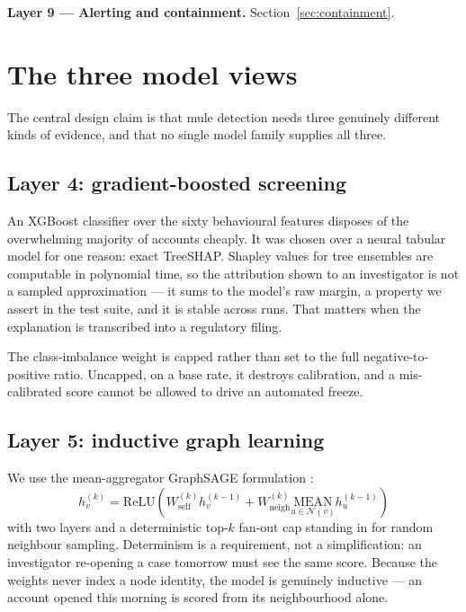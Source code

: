 \documentclass{article}
\begin{document}
\noindent\textbf{Layer 9 --- Alerting and containment.}
Section~\ref{sec:containment}.

\section{The three model views}
\label{sec:models}

The central design claim is that mule detection needs three genuinely different
kinds of evidence, and that no single model family supplies all three.

\subsection{Layer 4: gradient-boosted screening}

An XGBoost classifier over the sixty behavioural features disposes of the
overwhelming majority of accounts cheaply. It was chosen over a neural tabular
model for one reason: exact TreeSHAP. Shapley values for tree ensembles are
computable in polynomial time, so the attribution shown to an investigator is
not a sampled approximation --- it sums to the model's raw margin, a property we
assert in the test suite, and it is stable across runs. That matters when the
explanation is transcribed into a regulatory filing.

The class-imbalance weight is capped rather than set to the full negative-to-
positive ratio. Uncapped, on a \dsMuleRate{} base rate, it destroys calibration,
and a mis-calibrated score cannot be allowed to drive an automated freeze.

\subsection{Layer 5: inductive graph learning}

We use the mean-aggregator GraphSAGE formulation \cite{hamilton2017}:
%
\begin{equation}
h_v^{(k)} = \mathrm{ReLU}\!\left(
  W_{\text{self}}^{(k)} h_v^{(k-1)} +
  W_{\text{neigh}}^{(k)} \!\!\!\underset{u \in \mathcal{N}(v)}{\mathrm{MEAN}}\!\!\! h_u^{(k-1)}
\right)
\end{equation}
%
with two layers and a deterministic top-$k$ fan-out cap standing in for random
neighbour sampling. Determinism is a requirement, not a simplification: an
investigator re-opening a case tomorrow must see the same score. Because the
weights never index a node identity, the model is genuinely inductive --- an
account opened this morning is scored from its neighbourhood alone.
\end{document}
